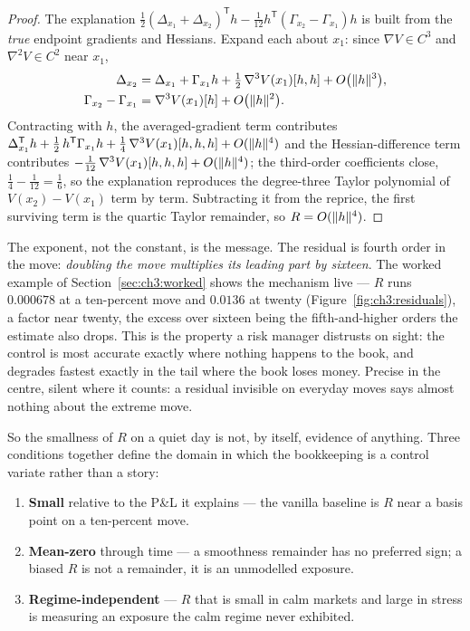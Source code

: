\documentclass[11pt]{book}
\theoremstyle{plain}
\theoremstyle{definition}
\theoremstyle{remark}
\DeclarePairedDelimiter{\norm}{\lVert}{\rVert}
\begin{document}
\begin{proof}
The explanation
$\tfrac{1}{2}(\Delta_{x_1}+\Delta_{x_2})^{\mathsf T} h
 - \tfrac{1}{12}h^{\mathsf T}(\Gamma_{x_2}-\Gamma_{x_1})h$
is built from the \emph{true} endpoint gradients and Hessians. Expand each
about $x_1$: since $\nabla V \in C^3$ and $\nabla^2 V \in C^2$ near $x_1$,
\begin{align*}
  \Delta_{x_2} &= \Delta_{x_1} + \Gamma_{x_1} h
    + \tfrac{1}{2}\,\nabla^3 V(x_1)[h,h] + O\bigl(\norm{h}^3\bigr), \\
  \Gamma_{x_2} - \Gamma_{x_1} &= \nabla^3 V(x_1)[h] + O\bigl(\norm{h}^2\bigr).
\end{align*}
Contracting with $h$, the averaged-gradient term contributes
$\Delta_{x_1}^{\mathsf T} h + \tfrac{1}{2}\, h^{\mathsf T}\Gamma_{x_1} h
 + \tfrac{1}{4}\,\nabla^3 V(x_1)[h,h,h] + O(\norm{h}^4)$
and the Hessian-difference term contributes
$-\tfrac{1}{12}\,\nabla^3 V(x_1)[h,h,h] + O(\norm{h}^4)$; the third-order
coefficients close, $\tfrac{1}{4} - \tfrac{1}{12} = \tfrac{1}{6}$, so the
explanation reproduces the degree-three Taylor polynomial of
$V(x_2)-V(x_1)$ term by term. Subtracting it from the reprice, the first
surviving term is the quartic Taylor remainder, so $R = O(\norm{h}^4)$.
\end{proof}

The exponent, not the constant, is the message. The residual is fourth order
in the move: \emph{doubling the move multiplies its leading part by sixteen}.
The worked
example of Section~\ref{sec:ch3:worked} shows the mechanism live --- $R$ runs
$0.000678$ at a ten-percent move and $0.0136$ at twenty
(Figure~\ref{fig:ch3:residuals}), a factor near twenty, the excess over
sixteen being the fifth-and-higher orders the estimate also drops. This is the
property a risk manager distrusts on sight: the control is most accurate
exactly where nothing happens to the book, and degrades fastest exactly in the
tail where the book loses money. Precise in the centre, silent where it counts:
a residual invisible on everyday moves says almost nothing about the extreme
move.

So the smallness of $R$ on a quiet day is not, by itself, evidence of anything.
Three conditions together define the domain in which the bookkeeping is a
control variate rather than a story:
\begin{enumerate}
  \item \textbf{Small} relative to the P\&L it explains --- the vanilla
        baseline is $R$ near a basis point on a ten-percent move.
  \item \textbf{Mean-zero} through time --- a smoothness remainder has no
        preferred sign; a biased $R$ is not a remainder, it is an
        unmodelled exposure.
  \item \textbf{Regime-independent} --- $R$ that is small in calm markets and
        large in stress is measuring an exposure the calm regime never
        exhibited.
\end{enumerate}
\end{document}
